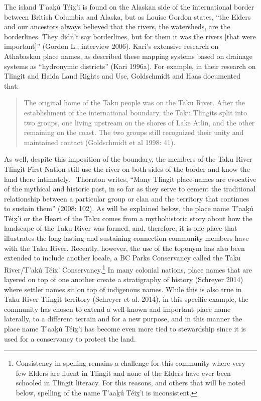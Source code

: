 The island T'aak̲ú Téix̲'i is found on the Alaskan side of the international border between British Columbia and Alaska, but as Louise Gordon states, “the Elders and our ancestors always believed that the rivers, the watersheds, are the borderlines. They didn’t say borderlines, but for them it was the rivers [that were important]” (Gordon L., interview 2006). Kari’s extensive research on Athabaskan place names, as described these mapping systems based on drainage systems as “hydronymic districts” (Kari 1996a). For example, in their research on Tlingit and Haida Land Rights and Use, Goldschmidt and Haas documented that:

\begin{quote}
The original home of the Taku people was on the Taku River. After the establishment of the international boundary, the Taku Tlingits split into two groups, one living upstream on the shores of Lake Atlin, and the other remaining on the coast. The two groups still recognized their unity and maintained contact (Goldschmidt et al 1998: 41).
\end{quote}

As well, despite this imposition of the boundary, the members of the Taku River Tlingit First Nation still use the river on both sides of the border and know the land there intimately. \ Thornton writes, “Many Tlingit place-names are evocative of the mythical and historic past, in so far as they serve to cement the traditional relationship between a particular group or clan and the territory that continues to sustain them” (2008: 102). As will be explained below, the place name T'aak̲ú Téix̲'i or the Heart of the Taku comes from a mythohistoric story about how the landscape of the Taku River was formed, and, therefore, it is one place that illustrates the long-lasting and sustaining connection community members have with the Taku River. Recently, however, the use of the toponym has also been extended to include another locale, a BC Parks Conservancy called the Taku River/T’akú Téix’ Conservancy.\footnote{Consistency in spelling remains a challenge for this community where very few Elders are fluent in Tlingit and none of the Elders have ever been schooled in Tlingit literacy. For this reasons, and others that will be noted below, spelling of the name T'aak̲ú Téix̲'i is inconsistent. } In many colonial nations, place names that are layered on top of one another create a stratigraphy of history (Schreyer 2014) where settler names sit on top of indigenous names. While this is also true in Taku River Tlingit territory (Schreyer et al. 2014), in this specific example, the community has chosen to extend a well-known and important place name laterally, to a different terrain and for a new purpose, and in this manner the place name T'aak̲ú Téix̲'i has become even more tied to stewardship since it is used for a conservancy to protect the land.

